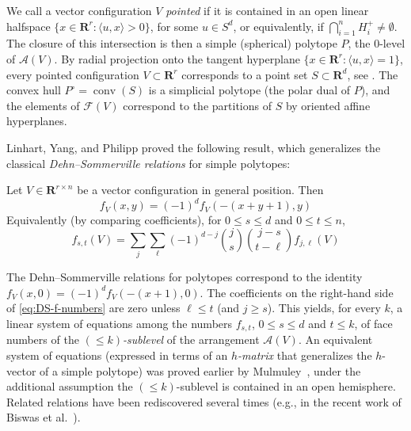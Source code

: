 \documentclass[a4paper,USenglish,cleveref, autoref, thm-restate,nolineno]{socg-lipics-v2021}
\newcommand{\arr}{\mathcal{A}}
\DeclareMathOperator{\conv}{conv}
\renewcommand{\leq}{\leqslant}
\renewcommand{\geq}{\geqslant}
\newcommand{\R}{\mathbf{R}}
\newcommand{\uli}[1]{\textcolor{blue}{\textsl{Uli: #1}}}
\begin{document}
We call a vector configuration $V$ \emph{pointed} if it is contained in an open linear halfspace $\{x\in \R^r\colon \langle u,x\rangle >0\}$, for some $u\in S^d$, or equivalently, if %
$\bigcap_{i=1}^n H^+_i\neq \emptyset$. %
The closure of this intersection is then a simple (spherical) polytope $P$, the $0$-level of $\arr(V)$.
By radial projection onto the tangent hyperplane $\{x\in \R^r\colon \langle u,x\rangle = 1\}$, every pointed configuration $V\subset \R^r$ corresponds to a point set $S\subset \R^d$, see \cite[Sec.~5.6]{Matousek:2002aa}. %
The convex hull $P^\circ=\conv(S)$ is a simplicial polytope (the polar dual of $P$), and the elements of $\mathcal{F}(V)$ correspond to the partitions of $S$ by oriented affine hyperplanes. 


Linhart, Yang, and Philipp \cite{Linhart:2000aa} proved the following result, which generalizes the classical \emph{Dehn--Sommerville relations} for simple polytopes:
\begin{theorem}
\label{thm:DS-levels}
Let $V \in \R^{r\times n}$ be a vector configuration in general position. Then
\begin{equation}
\label{eq:DS-f-poly}
f_V(x,y)=(-1)^d f_V(-(x+y+1),y)
\end{equation}
Equivalently (by comparing coefficients), for $0\leq s\leq d$ and $0\leq t\leq n$,
\begin{equation}
\label{eq:DS-f-numbers}
f_{s,t}(V)=\sum_{j} \sum_{\ell} (-1)^{d-j} \binom{j}{s} \binom{j-s}{t-\ell} f_{j,\ell}(V) 
\end{equation}
\end{theorem}
\begin{remark}
The Dehn--Sommerville relations for polytopes correspond to the identity $f_V(x,0)=(-1)^d f_V(-(x+1),0)$. The coefficients on the right-hand side of \eqref{eq:DS-f-numbers} are zero unless $\ell \leq t$ (and $j\geq s$). This yields, for every $k$, a linear system of equations among the numbers $f_{s,t}$, $0\leq s\leq d$ and $t\leq k$, of face numbers of the  \emph{$(\leq k)$-sublevel} of the arrangement $\arr(V)$. An equivalent system of equations (expressed in terms of an \emph{$h$-matrix} that generalizes the $h$-vector of a simple polytope) was proved earlier by Mulmuley~\cite{Mulmuley:1993aa}, under the additional assumption the $(\leq k)$-sublevel is contained in an open hemisphere. %
Related relations have been rediscovered several times (e.g., in the recent work of Biswas et al.~\cite{Biswas:2024aa}).
\end{remark}
\end{document}
